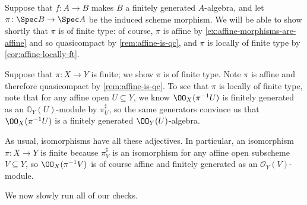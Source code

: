 \documentclass[../notes.tex]{subfiles}
\begin{document}
\begin{example}
	Suppose that $f\colon A\to B$ makes $B$ a finitely generated $A$-algebra, and let $\pi\colon\Spec B\to\Spec A$ be the induced scheme morphism. We will be able to show shortly that $\pi$ is of finite type: of course, $\pi$ is affine by \autoref{ex:affine-morphisms-are-affine} and so quasicompact by \autoref{rem:affine-is-qc}, and $\pi$ is locally of finite type by \autoref{cor:affine-locally-ft}.
\end{example}
\begin{example}
	Suppose that $\pi\colon X\to Y$ is finite; we show $\pi$ is of finite type. Note $\pi$ is affine and therefore quasicompact by \autoref{rem:affine-is-qc}. To see that $\pi$ is locally of finite type, note that for any affine open $U\subseteq Y$, we know $\OO_X(\pi^{-1}U)$ is finitely generated as an $\mathbb O_Y(U)$-module by $\pi^\sharp_U$, so the same generators convince us that $\OO_X(\pi^{-1}U)$ is a finitely generated $\OO_Y(U)$-algebra.
\end{example}
\begin{example}
	As usual, isomorphisms have all these adjectives. In particular, an isomorphism $\pi\colon X\to Y$ is finite because $\pi^\sharp_V$ is an isomorphism for any affine open subscheme $V\subseteq Y$, so $\OO_X(\pi^{-1}V)$ is of course affine and finitely generated as an $\mathcal O_Y(V)$-module.
\end{example}
We now slowly run all of our checks.
\end{document}
